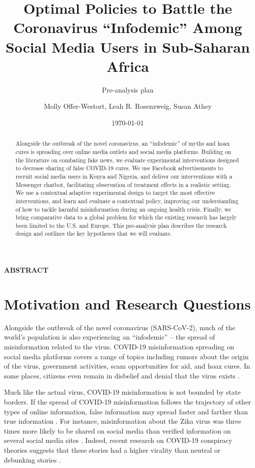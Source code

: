 \documentclass[letterpaper, 12pt, parskip=full,DIV=10]{scrartcl}
\title{Optimal Policies to Battle the Coronavirus ``Infodemic'' Among Social Media Users in Sub-Saharan Africa}
\subtitle{Pre-analysis plan}
\author{Molly Offer-Westort, Leah R. Rosenzweig, Susan Athey}
\date{\today}
\begin{document}
%
\normalsize%
\maketitle%
\tableofcontents%
\clearpage%


\centerline{\textbf{ABSTRACT}}
\begin{abstract}
Alongside the outbreak of the novel coronavirus, an “infodemic” of myths and hoax cures is spreading over online media outlets and social media platforms. Building on the literature on combating fake news, we evaluate experimental interventions designed to decrease sharing of false COVID-19 cures. We use Facebook advertisements to recruit social media users in Kenya and Nigeria, and deliver our interventions with a Messenger chatbot, facilitating observation of treatment effects in a realistic setting. We use a contextual adaptive experimental design to target the most effective interventions, and learn and evaluate a contextual policy, improving our understanding of how to tackle harmful misinformation during an ongoing health crisis. Finally, we bring comparative data to a global problem for which the existing research has largely been limited to the U.S. and Europe. This pre-analysis plan describes the research design and outlines the key hypotheses that we will evaluate.
\end{abstract}





\section{Motivation and Research Questions}

Alongside the outbreak of the novel coronavirus (SARS-CoV-2), much of the world's population is also experiencing an ``infodemic'' -- the spread of misinformation related to the virus. COVID-19 misinformation spreading on social media platforms covers a range of topics including rumors about the origin of the virus, government activities, scam opportunities for aid, and hoax cures. In some places, citizens even remain in disbelief and denial that the virus exists \citep{mwaura2019why-some}. 

Much like the actual virus, COVID-19 misinformation is not bounded by state borders. If the spread of COVID-19 misinformation follows the trajectory of other types of online information, false information may spread faster and farther than true information \citep{vosoughi2018spread}. For instance, misinformation about the Zika virus was three times more likely to be shared on social media than verified information on several social media sites \citep{sharma2017zika}. Indeed, recent research on COVID-19 conspiracy theories suggests that these stories had a higher virality than neutral or debunking stories \citep{HKS_whatsapp}. %
 
\end{document}
